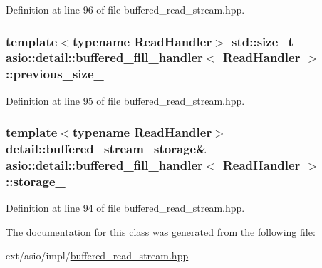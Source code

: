 Definition at line 96 of file buffered\+\_\+read\+\_\+stream.\+hpp.

\hypertarget{classasio_1_1detail_1_1buffered__fill__handler_aa02fc3d81409dab3abca8936143d61d9}{}
\subsubsection[{previous\+\_\+size\+\_\+}]{\setlength{\rightskip}{0pt plus 5cm}template$<$typename Read\+Handler$>$ std\+::size\+\_\+t {\bf asio\+::detail\+::buffered\+\_\+fill\+\_\+handler}$<$ Read\+Handler $>$\+::previous\+\_\+size\+\_\+}\label{classasio_1_1detail_1_1buffered__fill__handler_aa02fc3d81409dab3abca8936143d61d9}


Definition at line 95 of file buffered\+\_\+read\+\_\+stream.\+hpp.

\hypertarget{classasio_1_1detail_1_1buffered__fill__handler_a72f7cbdd99e8f826677509495865484f}{}
\subsubsection[{storage\+\_\+}]{\setlength{\rightskip}{0pt plus 5cm}template$<$typename Read\+Handler$>$ {\bf detail\+::buffered\+\_\+stream\+\_\+storage}\& {\bf asio\+::detail\+::buffered\+\_\+fill\+\_\+handler}$<$ Read\+Handler $>$\+::storage\+\_\+}\label{classasio_1_1detail_1_1buffered__fill__handler_a72f7cbdd99e8f826677509495865484f}


Definition at line 94 of file buffered\+\_\+read\+\_\+stream.\+hpp.



The documentation for this class was generated from the following file\+:\begin{DoxyCompactItemize}
\item 
ext/asio/impl/\hyperlink{impl_2buffered__read__stream_8hpp}{buffered\+\_\+read\+\_\+stream.\+hpp}\end{DoxyCompactItemize}
